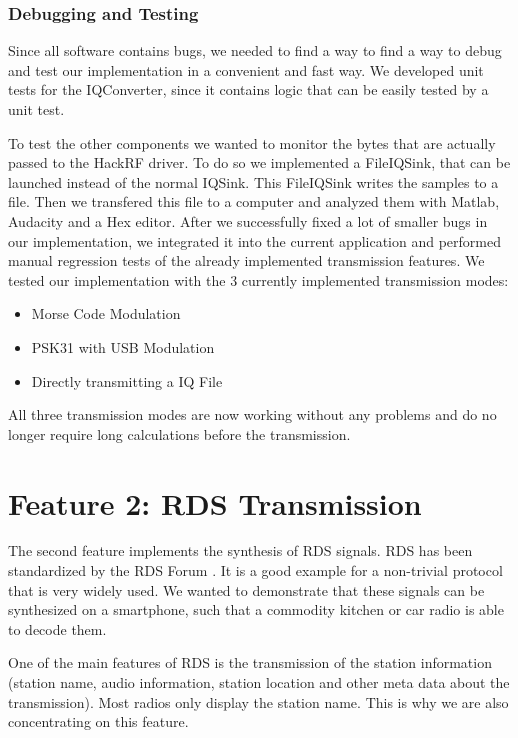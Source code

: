 \subsubsection{Debugging and Testing}
Since all software contains bugs, we needed to find a way to find a way to debug and test our implementation in a convenient and fast way. We developed unit tests for the IQConverter, since it contains logic that can be easily tested by a unit test. 

To test the other components we wanted to monitor the bytes that are actually passed to the HackRF driver. To do so we implemented a FileIQSink, that can be launched instead of the normal IQSink. This FileIQSink writes the samples to a file. Then we transfered this file to a computer and analyzed them with Matlab, Audacity and a Hex editor. 
After we successfully fixed a lot of smaller bugs in our implementation, we integrated it into the current application and performed manual regression tests of the already implemented transmission features. We tested our implementation with the 3 currently implemented transmission modes: 
\begin{itemize}
	\item Morse Code Modulation
	\item PSK31 with USB Modulation
	\item Directly transmitting a IQ File 
\end{itemize}

All three transmission modes are now working without any problems and do no longer require long calculations before the transmission. 



\section{Feature 2: RDS Transmission}
\label{sec:impl:feature2}
The second feature implements the synthesis of \ac{RDS} signals. \ac{RDS} has been standardized by the RDS Forum \cite{RDS1999}. It is a good example for a non-trivial protocol that is very widely used. We wanted to demonstrate that these signals can be synthesized on a smartphone, such that a commodity kitchen or car radio is able to decode them. 

One of the main features of RDS is the transmission of the station information (station name, audio information, station location and other meta data about the transmission). Most radios only display the station name. This is why we are also concentrating on this feature. 


